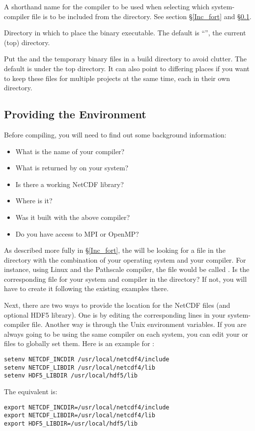 \begin{klist}
 A shorthand name for the compiler to be used when
selecting which system-compiler file is to be included from the
 directory. See section \S\ref{Inc_fort} and
\S\ref{make_env}.

\begin{klist}
   Directory in which to place the binary executable.
The default is ``'', the current (top) directory.

   Put the  and the temporary binary files
in a build directory to avoid clutter. The default is 
under the top directory. It can also point to differing places if you want
to keep these files for multiple projects at the same time, each in
their own directory.
\end{klist}
\end{klist}

\subsection{Providing the Environment}
\label{make_env}

Before compiling, you will need to find out some background information:
\begin{itemize}
 \item What is the name of your compiler?
 \item What is returned by  on your system?
 \item Is there a working NetCDF library?
 \item Where is it?
 \item Was it built with the above compiler?
 \item Do you have access to MPI or OpenMP?
\end{itemize}
As described more fully in \S\ref{Inc_fort}, the  will be
looking for a file in the  directory with the
combination of your operating system and your compiler. For
instance, using Linux and the Pathscale compiler, the file would be
called . Is the corresponding file for your
system and compiler in the  directory? If not, you
will have to create it following the existing examples there.

Next, there are two ways to provide the location for the NetCDF
files (and optional HDF5 library). One is by editing the corresponding
lines in your system-compiler file. Another way is through the
Unix environment variables. If you are always going to be using
the same compiler on each system, you can edit your 
or  files to globally set them. Here is an example for
:
\begin{verbatim}
setenv NETCDF_INCDIR /usr/local/netcdf4/include
setenv NETCDF_LIBDIR /usr/local/netcdf4/lib
setenv HDF5_LIBDIR /usr/local/hdf5/lib
\end{verbatim}
The  equivalent is:
\begin{verbatim}
export NETCDF_INCDIR=/usr/local/netcdf4/include
export NETCDF_LIBDIR=/usr/local/netcdf4/lib
export HDF5_LIBDIR=/usr/local/hdf5/lib
\end{verbatim}

